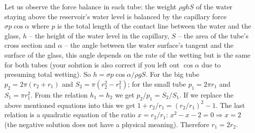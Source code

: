 {\ifEngSolution
Let us observe the force balance in each tube: the weight $\rho g h S$ of the water staying above the reservoir’s water level is balanced by the capillary force $\sigma p \cos \alpha$ where $p$ is the total length of the contact line between the water and the glass, $h$ – the height of the water level in the capillary, $S$ – the area of the tube’s cross section and $\alpha$ – the angle between the water surface’s tangent and the surface of the glass, this angle depends on the rate of the wetting but is the same for both tubes (your solution is also correct if you left out $\cos\alpha$ due to presuming total wetting). So $h=\sigma p
\cos\alpha/\rho g S$. For the big tube $p_2=2\pi (r_2+r_1)$ and $S_2=\pi(r_2^2-r_1^2)$; for the small tube $p_1=2\pi r_1$ and $S_1=\pi
r_1^2$. From the relation $h_1=h_2$ we get $p_2/p_1=S_2/S_1$. If we replace the above mentioned equations into this we get $1+r_2/r_1=(r_2/r_1)^2-1$. The last relation is a quadratic equation of the ratio $x=r_2/r_1$: $x^2-x-2=0 \Rightarrow x=2$ (the negative solution does not have a physical meaning). Therefore $r_1=2 r_2$.
\fi
}